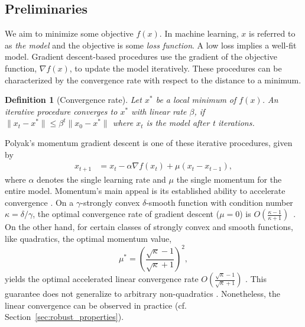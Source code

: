 \documentclass{article} %
\newtheorem{definition}[theorem]{Definition}
\newcommand{\yell}[1]{#1}
\begin{document}


\vspace{-0.5em}
\subsection{Preliminaries}
\label{sec:robust_preliminaries}
We aim to minimize some objective $f(x)$.
In machine learning, $x$ is referred to as {\em the model} and the objective is some {\em loss function}.
A low loss implies a well-fit model.
Gradient descent-based procedures use the gradient of the objective function, $\nabla f(x)$, to update the model iteratively.
These procedures can be characterized by the convergence rate with respect to the distance to a minimum.
\begin{definition} [Convergence rate]
	Let $x^*\!$ be a local minimum of $f(x)$. %
	An iterative procedure converges to $x^*$ with linear rate $\beta$, if $\| x_{t} - x^* \| \leq \beta^t \| x_0 - x^* \|$ where $x_t$ is the model after t iterations.
\end{definition}
Polyak's momentum gradient descent \citep{polyak1964some} is one of these iterative procedures, given by
\begin{align}
	x_{t+1}  &= x_t - \alpha \nabla f(x_t) + \mu (x_t - x_{t-1}),
	\label{eqn:momentum_gd}
\end{align} 
where $\alpha$ denotes the single learning rate and $\mu$ the single momentum for the entire model.   
Momentum's main appeal is its established ability to {accelerate convergence} \citep{polyak1964some}. 
On a $\gamma$-strongly convex $\delta$-smooth function with condition number $\kappa=\delta/\gamma$, the optimal convergence rate of gradient descent ($\mu=0$)
 is $O(\frac{\kappa-1}{\kappa+1})$~\citep{nesterov2013introductory}.
\yell{On the other hand, for certain classes of strongly convex and smooth functions, like quadratics,
 the optimal momentum value,
\begin{equation}
	\mu^* = \left(\frac{\sqrt{\kappa}-1}{\sqrt{\kappa}+1}\right)^2,
	\label{eqn:optimal_momentum}
\end{equation}
yields the optimal accelerated linear convergence rate $O(\frac{\sqrt{\kappa}-1}{\sqrt{\kappa}+1})$ 
}.
This guarantee does not generalize to arbitrary non-quadratics \citep{lessard2016analysis}.
Nonetheless, the linear convergence can be observed in practice (cf. Section~\ref{sec:robust_properties}).
\end{document}
